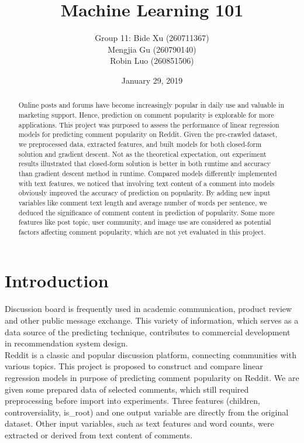 \documentclass[12pt]{article}
\title{\Huge Machine Learning 101}
\author{Group 11: Bide Xu (260711367)\\Mengjia Gu (260790140)\\Robin Luo (260851506)}
\date{\normalsize January 29, 2019}
\begin{document}
\begin{titlingpage}
\maketitle
\end{titlingpage}

\newpage
\begin{abstract}
Online posts and forums have become increasingly popular in daily use and valuable in marketing support. Hence, prediction on comment popularity is explorable for more applications. This project was purposed to assess the performance of linear regression models for predicting comment popularity on Reddit. Given the pre-crawled dataset, we preprocessed data, extracted features, and built models for both closed-form solution and gradient descent. Not as the theoretical expectation, out experiment results illustrated that closed-form solution is better in both runtime and accuracy than gradient descent method in runtime. Compared models differently implemented with text features, we noticed that involving text content of a comment into models obviously improved the accuracy of prediction on popularity. By adding new input variables like comment text length and average number of words per sentence, we deduced the significance of comment content in prediction of popularity. Some more features like post topic, user community, and image use are considered as potential factors affecting comment popularity, which are not yet evaluated in this project.
\end{abstract}

\section*{Introduction}
Discussion board is frequently used in academic communication, product review and other public message exchange. This variety of information, which serves as a data source of the predicting technique, contributes to commercial development in recommendation system design. \cite{rohlin}\\

Reddit is a classic and popular discussion platform, connecting communities with various topics. \cite{reddit} This project is proposed to construct and compare linear regression models in purpose of predicting comment popularity on Reddit. We are given some prepared data of selected comments, which still required preprocessing before import into experiments. Three features (children, controversiality, is\_root) and one output variable are directly from the original dataset. Other input variables, such as text features and word counts, were extracted or derived from text content of comments.\\
\end{document}
